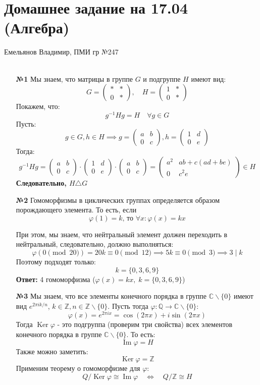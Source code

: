 \documentclass[a4paper]{article}
\newcommand{\mat}[1]{\begin{pmatrix} #1 \end{pmatrix}}
\newcommand{\Ker}{\operatorname{Ker}}
\renewcommand{\Im}{\operatorname{Im}}
\renewcommand{\phi}{\varphi}
\newcommand{\lr}{\Leftrightarrow}
\newcommand{\CC}{\mathbb{C}}
\newcommand{\QQ}{\mathbb{Q}}
\newcommand{\ZZ}{\mathbb{Z}}
\newcommand{\divides}{\;|\;}
\begin{document}
\section*{Домашнее задание на 17.04 (Алгебра)}
 {\large Емельянов Владимир, ПМИ гр №247}\\\\
\begin{enumerate}
    \item[\textbf{№1}]Мы знаем, что матрицы в группе $G$ и подгруппе $H$ имеют вид:
    $$G = \mat{* & * \\0 & *}, \quad H = \mat{1 & * \\0 & *}$$
    Покажем, что:
    $$g^{-1}Hg = H \quad \forall g \in G$$
    Пусть:
    $$g \in G, h \in H \implies g = \mat{a & b\\0 & c}, h = \mat{1 & d \\ 0 & e}$$
    Тогда:
    $$g^{-1}Hg = \mat{a & b\\0 & c} \cdot \mat{1 & d \\ 0 & e} \cdot  \mat{a & b\\0 & c}  = \begin{pmatrix}
        a^2 & ab + c(ad + be) \\
        0 & c^2e
        \end{pmatrix}  \in H$$
    \textbf{Следовательно, $H \triangle G$}

    \item[\textbf{№2}]Гомоморфизмы в циклических группах определяется образом порождающего элемента. 
    То есть, если $$\text{$\phi(1) = k$, то $\forall x: \phi(x) = kx$}$$

    При этом, мы знаем, что нейтральный элемент должен переходить в нейтральный,
     следовательно, должно выполняться:
    $$\phi(0 \pmod{20}) = 20k \equiv 0 \pmod{12} \implies 5k \equiv 0 \pmod{3} \implies 3 \divides k $$
    Поэтому подходят только:
    $$k = \{0, 3, 6, 9\}$$
    \textbf{Ответ: } 4 гомоморфизма ($\phi(x) = kx, \;k = \{0, 3, 6, 9\}$)\\

    \item[\textbf{№3}]Мы знаем, что все элементы конечного порядка в группе 
    $\CC\backslash \{0\}$ имеют вид $e^{2\pi i k/n}$, 
    $k\in \ZZ, n \in \ZZ \backslash \{0\}$.
    Пусть тогда $\phi: \QQ \to \CC\backslash \{0\}$:
    $$\phi(x) = e^{2\pi i x} = \cos(2\pi x)+i\sin(2 \pi x)$$
    Тогда $\Ker \phi$ - это подгруппа (проверим три свойства) всех элементов конечного 
    порядка в группе $\CC\backslash \{0\}$. То есть:
    $$\Im \phi = H$$
    Также можно заметить:
    $$\Ker \phi = \ZZ$$
    Применим теорему о гомоморфизме для $\phi$:
    $$Q / \Ker \phi \cong \Im \phi \quad \lr \quad  Q / \ZZ \cong H$$\\
    
    

\end{enumerate}
\end{document}
